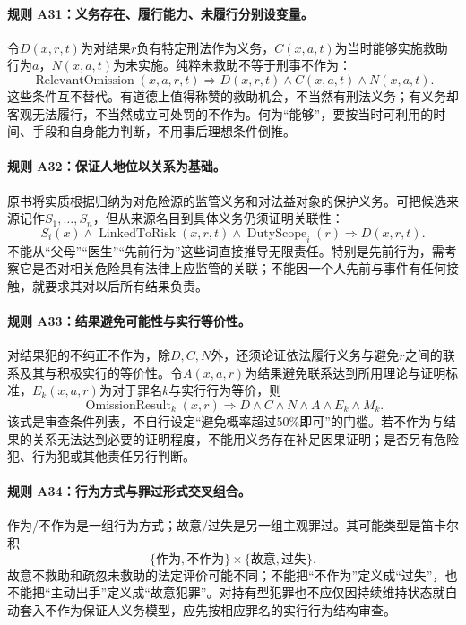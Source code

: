 \paragraph{规则 A31：义务存在、履行能力、未履行分别设变量。}
令$D(x,r,t)$为对结果$r$负有特定刑法作为义务，$C(x,a,t)$为当时能够实施救助行为$a$，$N(x,a,t)$为未实施。纯粹未救助不等于刑事不作为：
\[
\operatorname{RelevantOmission}(x,a,r,t)
\Longrightarrow D(x,r,t)\land C(x,a,t)\land N(x,a,t).
\]
这些条件互不替代。有道德上值得称赞的救助机会，不当然有刑法义务；有义务却客观无法履行，不当然成立可处罚的不作为。何为“能够”，要按当时可利用的时间、手段和自身能力判断，不用事后理想条件倒推。

\paragraph{规则 A32：保证人地位以关系为基础。}
原书将实质根据归纳为对危险源的监管义务和对法益对象的保护义务。可把候选来源记作$S_1,\ldots,S_n$，但从来源名目到具体义务仍须证明关联性：
\[
S_i(x)\land\operatorname{LinkedToRisk}(x,r,t)
\land\operatorname{DutyScope}_i(r)
\Longrightarrow D(x,r,t).
\]
不能从“父母”“医生”“先前行为”这些词直接推导无限责任。特别是先前行为，需考察它是否对相关危险具有法律上应监管的关联；不能因一个人先前与事件有任何接触，就要求其对以后所有结果负责。

\paragraph{规则 A33：结果避免可能性与实行等价性。}
对结果犯的不纯正不作为，除$D,C,N$外，还须论证依法履行义务与避免$r$之间的联系及其与积极实行的等价性。令$A(x,a,r)$为结果避免联系达到所用理论与证明标准，$E_k(x,a,r)$为对于罪名$k$与实行行为等价，则
\[
\operatorname{OmissionResult}_k(x,r)
\Longrightarrow D\land C\land N\land A\land E_k\land M_k.
\]
该式是审查条件列表，不自行设定“避免概率超过50\%即可”的门槛。若不作为与结果的关系无法达到必要的证明程度，不能用义务存在补足因果证明；是否另有危险犯、行为犯或其他责任另行判断。

\paragraph{规则 A34：行为方式与罪过形式交叉组合。}
作为/不作为是一组行为方式；故意/过失是另一组主观罪过。其可能类型是笛卡尔积
\[
\{\text{作为},\text{不作为}\}\times\{\text{故意},\text{过失}\}.
\]
故意不救助和疏忽未救助的法定评价可能不同；不能把“不作为”定义成“过失”，也不能把“主动出手”定义成“故意犯罪”。对持有型犯罪也不应仅因持续维持状态就自动套入不作为保证人义务模型，应先按相应罪名的实行行为结构审查。

